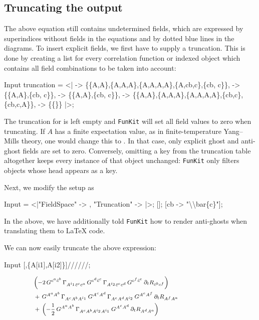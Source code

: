 \documentclass[preprint,10pt,sort&compress]{elsarticle}
\newcommand{\wideleft}[1]{\makebox[\linewidth][l]{\hspace{3.0em}#1}}
\newcommand{\mathem}{\mmaInlineCell{Code}}
\newcommand{\FunKit}{\texttt{FunKit}\xspace}
\begin{document}
\subsection{Truncating the output}

The above equation still contains undetermined fields, which are expressed by superindices without fields in the equations and by dotted blue lines in the diagrams.
To insert explicit fields, we first have to supply a truncation. This is done by creating a list for every correlation function or indexed object which contains all field combinations to be taken into account:
%
\begin{mmaCell}{Input}
truncation = <|
   -> \{\{A,A\},\{A,A,A\},\{A,A,A,A\},\{A,cb,c\},\{cb, c\}\},
   -> \{\{A,A\},\{cb, c\}\},
   -> \{\{A,A\},\{cb, c\}\},
   -> \{\{A,A\},\{A,A,A\},\{A,A,A,A\},\{cb,c\},\{cb,c,A\}\},
   -> \{\{\}\}
 |>;
\end{mmaCell}
%
The truncation for \mathem{\mmaDef{Field}} is left empty and \FunKit will set all field values to zero when truncating. If $A$ has a finite expectation value, as in finite-temperature Yang--Mills theory, one would change this to \mathem{\mmaDef{Field} -> {{A}}}. In that case, only explicit ghost and anti-ghost fields are set to zero.
Conversely, omitting a key from the truncation table altogether keeps every instance of that object unchanged: \FunKit only filters objects whose head appears as a key.

Next, we modify the setup as
%
\begin{mmaCell}{Input}
 = <|"FieldSpace" -> , "Truncation" -> |>;
[];
[cb -> "{\textbackslash\textbackslash}bar\{c\}"];
\end{mmaCell}
%
In the above, we have additionally told \FunKit how to render anti-ghosts when translating them to \LaTeX{} code.

We can now easily truncate the above expression:
%
\begin{mmaCell}{Input}
[,\{A[i1],A[i2]\}]//////;
\end{mmaCell}
\vspace{-1.5ex}
\begin{equation*}
\wideleft{\footnotesize$%
	\begin{aligned}\  &\left(-2\,G^{c^{a}\bar{c}^{b}}\,\Gamma_{A^{i_1}\bar{c}^{c}c^{a}}\,G^{c^{d}\bar{c}^{c}}\,\Gamma_{A^{i_2}\bar{c}^{e}c^{d}}\,G^{c^{f}\bar{c}^{e}}\,\partial_t R_{\bar{c}^{b}c^{f}}\right)
		\\ &\,+\,G^{A^{a}A^{b}}\,\Gamma_{A^{c}A^{b}A^{i_1}}\,G^{A^{c}A^{d}}\,\Gamma_{A^{e}A^{d}A^{i_2}}\,G^{A^{e}A^{f}}\,\partial_t R_{A^{f}A^{a}}
		\\ &\,+\,\left(-\frac{1}{2}\,G^{A^{a}A^{b}}\,\Gamma_{A^{c}A^{b}A^{i_2}A^{i_1}}\,G^{A^{c}A^{d}}\,\partial_t R_{A^{d}A^{a}}\right)
	\end{aligned}
$}
\end{equation*}
\vspace{-1ex}
\end{document}
